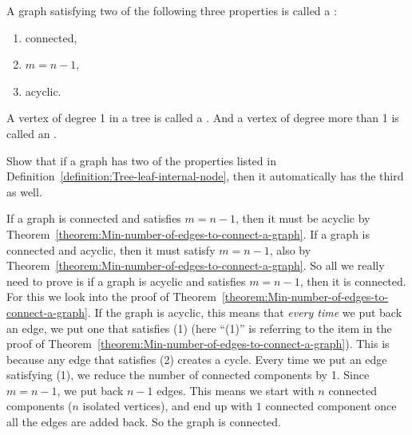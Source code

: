 \begin{definition} \label{definition:Tree-leaf-internal-node}
A graph satisfying two of the following three properties is called a : 
\begin{enumerate}
    \item connected, 
    \item $m = n-1$, 
    \item acyclic.
\end{enumerate}
A vertex of degree 1 in a tree is called a . And a vertex of degree more than 1 is called an .
\end{definition}


\begin{flex}
\begin{exercise} \label{exercise:Equivalent-definitions-of-a-tree}
Show that if a graph has two of the properties listed in Definition~\ref{definition:Tree-leaf-internal-node}, then it automatically has the third as well.
\end{exercise}

\begin{solution}
If a graph is connected and satisfies $m = n-1$, then it must be acyclic by Theorem~\ref{theorem:Min-number-of-edges-to-connect-a-graph}. If a graph is connected and acyclic, then it must satisfy $m = n-1$, also by Theorem~\ref{theorem:Min-number-of-edges-to-connect-a-graph}. So all we really need to prove is if a graph is acyclic and satisfies $m=n-1$, then it is connected. For this we look into the proof of Theorem~\ref{theorem:Min-number-of-edges-to-connect-a-graph}. If the graph is acyclic, this means that \emph{every time} we put back an edge, we put one that satisfies (1) (here ``(1)'' is referring to the item in the proof of Theorem~\ref{theorem:Min-number-of-edges-to-connect-a-graph}). This is because any edge that satisfies (2) creates a cycle. Every time we put an edge satisfying (1), we reduce the number of connected components by 1. Since $m = n-1$, we put back $n-1$ edges. This means we start with $n$ connected components ($n$ isolated vertices), and end up with $1$ connected component once all the edges are added back. So the graph is connected.
\end{solution}
\end{flex}



